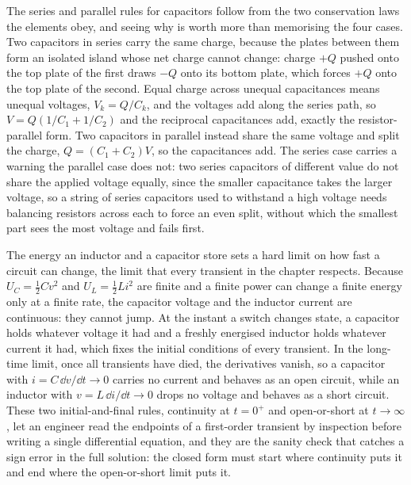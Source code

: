 The series and parallel rules for capacitors follow from the two conservation
laws the elements obey, and seeing why is worth more than memorising the four
cases. Two capacitors in series carry the same charge, because the plates
between them form an isolated island whose net charge cannot change: charge
$+Q$ pushed onto the top plate of the first draws $-Q$ onto its bottom plate,
which forces $+Q$ onto the top plate of the second. Equal charge across unequal
capacitances means unequal voltages, $V_k = Q/C_k$, and the voltages add along
the series path, so $V = Q(1/C_1 + 1/C_2)$ and the reciprocal capacitances add,
exactly the resistor-parallel form. Two capacitors in parallel instead share
the same voltage and split the charge, $Q = (C_1 + C_2)V$, so the capacitances
add. The series case carries a warning the parallel case does not: two series
capacitors of different value do not share the applied voltage equally, since
the smaller capacitance takes the larger voltage, so a string of series
capacitors used to withstand a high voltage needs balancing resistors across
each to force an even split, without which the smallest part sees the most
voltage and fails first.

The energy an inductor and a capacitor store sets a hard limit on how fast a
circuit can change, the limit that every transient in the chapter respects.
Because $U_C = \tfrac{1}{2}Cv^2$ and $U_L = \tfrac{1}{2}Li^2$ are finite and a
finite power can change a finite energy only at a finite rate, the capacitor
voltage and the inductor current are continuous: they cannot jump. At the
instant a switch changes state, a capacitor holds whatever voltage it had and a
freshly energised inductor holds whatever current it had, which fixes the
initial conditions of every transient. In the long-time limit, once all
transients have died, the derivatives vanish, so a capacitor with $i = C\,\dd
v/\dd t \to 0$ carries no current and behaves as an open circuit, while an
inductor with $v = L\,\dd i/\dd t \to 0$ drops no voltage and behaves as a short
circuit. These two initial-and-final rules, continuity at $t = 0^+$ and
open-or-short at $t \to \infty$, let an engineer read the endpoints of a
first-order transient by inspection before writing a single differential
equation, and they are the sanity check that catches a sign error in the full
solution: the closed form must start where continuity puts it and end where the
open-or-short limit puts it.

